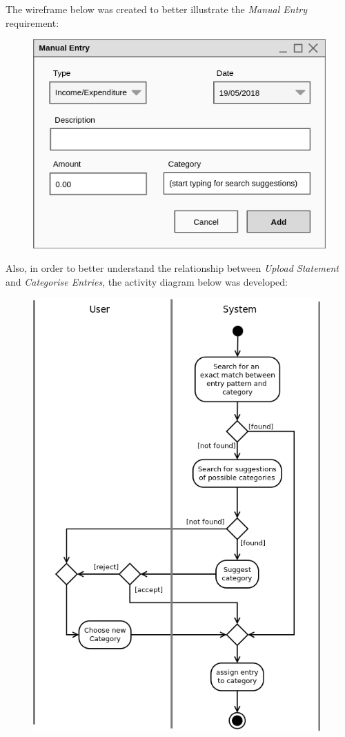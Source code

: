 The wireframe below was created to better illustrate the \emph{Manual Entry} requirement:
\begin{figure}[ht!]
  \begin{center}
    \includegraphics[width=14cm]{./contents/img/Wireframe_-_Manual_Entry.png}
  \end{center}
\end{figure}
\FloatBarrier

Also, in order to better understand the relationship between \emph{Upload
Statement} and \emph{Categorise Entries}, the activity diagram below was
developed:
\begin{figure}[ht!]
  \begin{center}
    \includegraphics[width=11cm]{./contents/img/Activity_Diagram_-_Categorise_Entries.png}
  \end{center}
\end{figure}
\FloatBarrier


